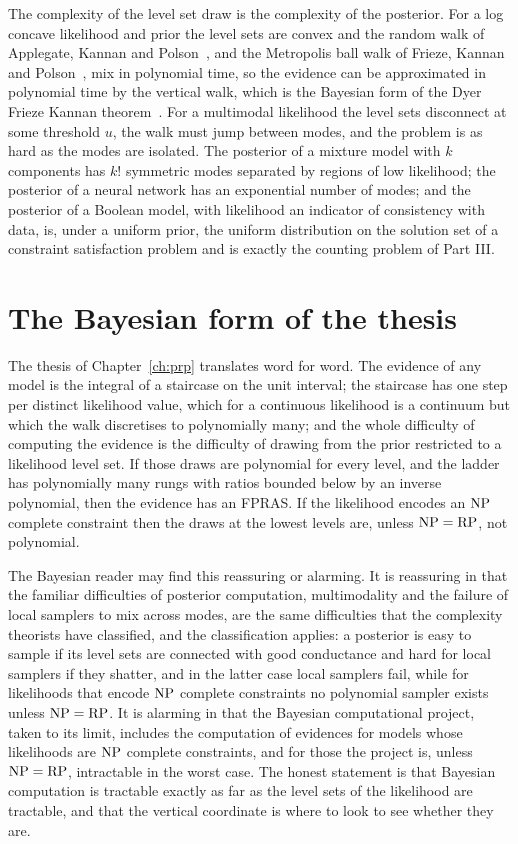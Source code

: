 The complexity of the level set draw is the complexity of the posterior. For a log concave likelihood and prior the level sets are convex and the random walk of Applegate, Kannan and Polson~\cite{AKP}, and the Metropolis ball walk of Frieze, Kannan and Polson~\cite{FKP}, mix in polynomial time, so the evidence can be approximated in polynomial time by the vertical walk, which is the Bayesian form of the Dyer Frieze Kannan theorem~\cite{DFK}. For a multimodal likelihood the level sets disconnect at some threshold $u$, the walk must jump between modes, and the problem is as hard as the modes are isolated. The posterior of a mixture model with $k$ components has $k!$ symmetric modes separated by regions of low likelihood; the posterior of a neural network has an exponential number of modes; and the posterior of a Boolean model, with likelihood an indicator of consistency with data, is, under a uniform prior, the uniform distribution on the solution set of a constraint satisfaction problem and is exactly the counting problem of Part III.

\section{The Bayesian form of the thesis}

The thesis of Chapter~\ref{ch:prp} translates word for word. The evidence of any model is the integral of a staircase on the unit interval; the staircase has one step per distinct likelihood value, which for a continuous likelihood is a continuum but which the walk discretises to polynomially many; and the whole difficulty of computing the evidence is the difficulty of drawing from the prior restricted to a likelihood level set. If those draws are polynomial for every level, and the ladder has polynomially many rungs with ratios bounded below by an inverse polynomial, then the evidence has an FPRAS. If the likelihood encodes an $\mathrm{NP}$ complete constraint then the draws at the lowest levels are, unless $\mathrm{NP} = \mathrm{RP}$, not polynomial.

The Bayesian reader may find this reassuring or alarming. It is reassuring in that the familiar difficulties of posterior computation, multimodality and the failure of local samplers to mix across modes, are the same difficulties that the complexity theorists have classified, and the classification applies: a posterior is easy to sample if its level sets are connected with good conductance and hard for local samplers if they shatter, and in the latter case local samplers fail, while for likelihoods that encode $\mathrm{NP}$ complete constraints no polynomial sampler exists unless $\mathrm{NP} = \mathrm{RP}$. It is alarming in that the Bayesian computational project, taken to its limit, includes the computation of evidences for models whose likelihoods are $\mathrm{NP}$ complete constraints, and for those the project is, unless $\mathrm{NP} = \mathrm{RP}$, intractable in the worst case. The honest statement is that Bayesian computation is tractable exactly as far as the level sets of the likelihood are tractable, and that the vertical coordinate is where to look to see whether they are.

